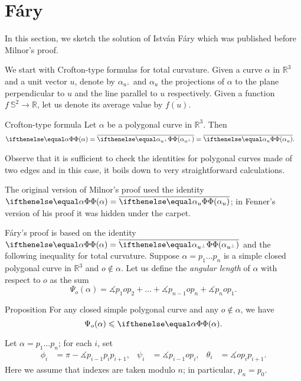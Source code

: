 \section{F\'ary}\label{sec:fary}

In this section, we sketch the solution of Istv\'an F\'ary \cite{fary} which was published before Milnor's proof.

We start with Crofton-type formulas for total curvature.
Given a curve $\alpha$ in $\mathbb{R}^3$ and a unit vector $u$, denote by $\alpha_{u^\perp}$ 
and $\alpha_u$ the projections of $\alpha$ to the plane perpendicular to $u$ and the line parallel to $u$ respectively.
Given a function $f\:\mathbb{S}^2\to\mathbb{R}$, let us denote its average value by $\overline{f(u)}$.

\begin{thm}{Crofton-type formula}\label{prop:tc-crofton}
Let $\alpha$ be a polygonal curve in $\mathbb{R}^3$.
Then
\begin{align*}
\tc\alpha
&=\overline{\tc{\alpha_{u^\perp}}}
=\overline{\tc{\alpha_u}}.
\end{align*}
\end{thm}


Observe that it is sufficient to check the identities for polygonal curves made of two edges
and in this case, it boils down to very straightforward calculations.
\qeds

The original version of Milnor's proof 
used the identity $\tc\alpha=\overline{\tc{\alpha_u}}$;
in Fenner's version of his proof it was hidden under the carpet.

F\'ary's proof is based on the identity $\tc\alpha=\overline{\tc{\alpha_{u^\perp}}}$ and the following inequality for total curvature.
Suppose $\alpha=p_1\dots p_n$ is a simple closed polygonal curve in $\mathbb{R}^3$ and $o\notin\alpha$.
Let us define the \emph{angular length} of $\alpha$ with respect to $o$ as the sum
\[\Psi_o(\alpha)=\measuredangle p_{1} o p_{2}+\dots+\measuredangle p_{n-1} o p_{n}+\measuredangle p_{n} o p_{1}.\]

\begin{thm}{Proposition}\label{prop:angular-length}
For any closed simple polygonal curve and any $o\notin\alpha$, we have 
\[\Psi_o(\alpha)\le \tc{\alpha}.\]
\end{thm}

Let $\alpha=p_1\dots p_n$; for each $i$, set 
\begin{align*}
\phi_i&=\pi-\measuredangle p_{i-1}p_ip_{i+1},
&
\psi_i&=\measuredangle p_{i-1} o p_{i},
&
\theta_i&=\measuredangle o p_i p_{i+1}.
\end{align*}
Here we assume that indexes are taken modulo $n$; in particular, $p_{n}=p_0$.

